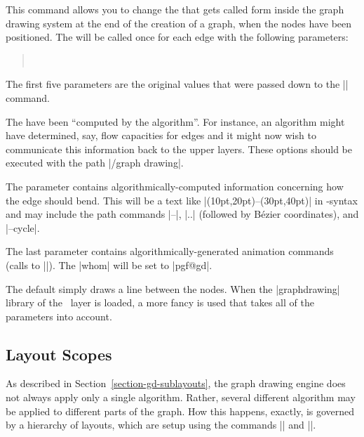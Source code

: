 \begin{command}{\pgfgdsetedgecallback{}}
    This command allows you to change the  that gets called form
    inside the graph drawing system at the end of the creation of a graph, when
    the nodes have been positioned. The  will be called once for
    each edge with the following parameters:
    \begin{quote}
        \\
    \end{quote}

    The first five parameters are the original values that were passed down to
    the |\pgfgdedge| command.

    The  have been ``computed by the
    algorithm''. For instance, an algorithm might have determined, say, flow
    capacities for edges and it might now wish to communicate this information
    back to the upper layers. These options should be executed with the path
    |/graph drawing|.

    The parameter  contains algorithmically-computed
    information concerning how the edge should bend. This will be a text like
    |(10pt,20pt)--(30pt,40pt)| in \tikzname-syntax and may include the path
    commands |--|,  |..| (followed by Bézier coordinates), and |--cycle|.

    The last parameter  contains algorithmically-generated
    animation commands (calls to |\pgfanimateattribute|). The |whom|
    will be set to |pgf@gd|.

    The default  simply draws a line between the nodes. When the
    |graphdrawing| library of the \tikzname\ layer is loaded, a more fancy
     is used that takes all of the parameters into account.
\end{command}


\subsection{Layout Scopes}
\label{section-gd-layout-scopes}

As described in Section~\ref{section-gd-sublayouts}, the graph drawing engine
does not always apply only a single algorithm. Rather, several different
algorithm may be applied to different parts of the graph. How this happens,
exactly, is governed by a hierarchy of layouts, which are setup using the
commands |\pgfgdbeginlayout| and |\pgfgdendlayout|.

